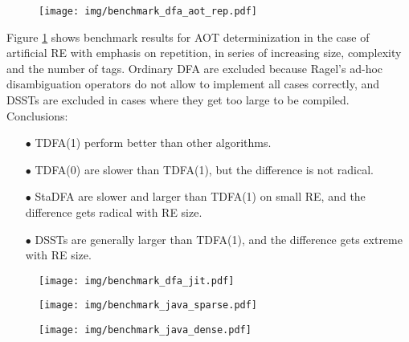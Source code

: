 \documentclass[]{article}
\begin{document}
\begin{figure}[t!]
\texttt{[image: img/benchmark\_dfa\_aot\_rep.pdf]}
\label{fig:benchmark_dfa_aot_rep}
\end{figure}

Figure \ref{fig:benchmark_dfa_aot_rep} shows benchmark results for AOT determinization
in the case of artificial RE with emphasis on repetition, in series of increasing size, complexity and the number of tags.
Ordinary DFA are excluded because Ragel's ad-hoc disambiguation operators do not allow to implement all cases correctly,
and DSSTs are excluded in cases where they get too large to be compiled.
Conclusions:
\medskip

\begin{itemize}

\item[$\bullet$]
TDFA(1) perform better than other algorithms.
\medskip

\item[$\bullet$]
TDFA(0) are slower than TDFA(1), but the difference is not radical.
\medskip

\item[$\bullet$]
StaDFA are slower and larger than TDFA(1) on small RE, and the difference gets radical with RE size.
\medskip

\item[$\bullet$]
DSSTs are generally larger than TDFA(1), and the difference gets extreme with RE size.
\medskip

\end{itemize}

\pagebreak

\begin{figure}[t!]
\texttt{[image: img/benchmark\_dfa\_jit.pdf]}
\label{fig:benchmark_dfa_jit}
\end{figure}

\FloatBarrier

\begin{figure}[t!]
\texttt{[image: img/benchmark\_java\_sparse.pdf]}
\label{fig:benchmark_java_sparse}
\end{figure}

\begin{figure}[b!]
\texttt{[image: img/benchmark\_java\_dense.pdf]}
\label{fig:benchmark_java_dense}
\end{figure}
\end{document}

